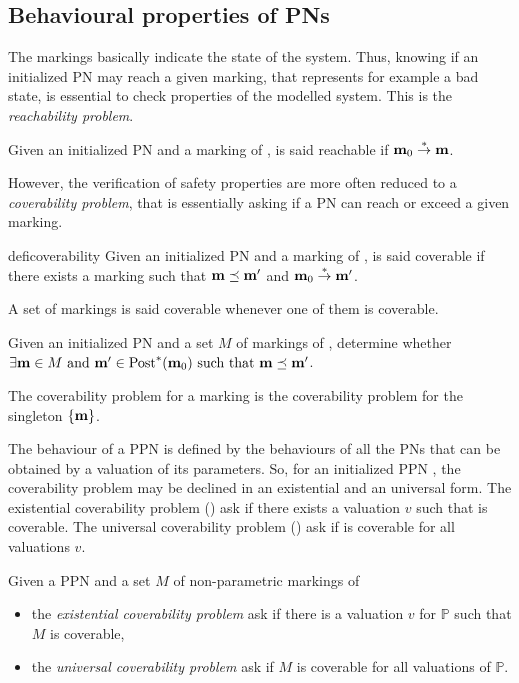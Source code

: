 \subsection{Behavioural properties of \acp{PN}}

The markings basically indicate the state of the system. Thus, knowing if an initialized \ac{PN} may reach a given marking, that represents for example a bad state, is essential to check properties of the modelled system. This is the \emph{reachability problem}.

\begin{defi}[Reachability]
  Given an initialized \ac{PN} \NPTm and a marking \marq of \tupleN, \marq is said reachable if $\mathbf{m}_0 \stackrel{*}{\to} \mathbf{m}$.
\end{defi}

However, the verification of safety properties are more often reduced to a \emph{coverability problem}, that is essentially asking if a \ac{PN} can reach or exceed a given marking.

\begin{restatable}[Coverability]{defi}{coverability}
  Given an initialized \ac{PN} \NPTm and a marking \marq of \tupleN, \marq is said coverable if there exists a marking \marqp such that $\mathbf{m} \preceq \mathbf{m'}$ and $\mathbf{m}_0 \stackrel{*}{\to} \mathbf{m'}$.

  A set of markings is said coverable whenever one of them is coverable.
\end{restatable}

\begin{defi}
  Given an initialized \ac{PN} \NPTm and a set $M$ of markings of \tupleN, determine whether $\exists \mathbf{m} \in M \text{ and } \mathbf{m'} \in \operatorname{Post}^*(\mathbf{m}_0) \text{ such that } \mathbf{m} \preceq \mathbf{m'}$.

  The coverability problem for a marking \marq is the coverability problem for the singleton $\{\mathbf{m}\}$.
\end{defi}

The behaviour of a \ac{PPN} is defined by the behaviours of all the \acp{PN} that can be obtained by a valuation of its parameters.
So, for an initialized \ac{PPN} \tupleS, the coverability problem may be declined in an existential and an universal form.
The existential coverability problem (\Ecov) ask if there exists a valuation $v$ such that \marq is coverable.
The universal coverability problem (\Ucov) ask if \marq is coverable for all valuations $v$.

\begin{defi}
  Given a \ac{PPN} \SPTPm and a set $M$ of non-parametric markings of \tupleS
  \begin{itemize}
    \item the \emph{existential coverability problem} ask if there is a valuation $v$ for $\mathbb{P}$ such that $M$ is coverable,
    \item the \emph{universal   coverability problem} ask if $M$ is coverable for all valuations of $\mathbb{P}$.
  \end{itemize}
\end{defi}


